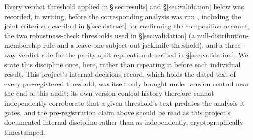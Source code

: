 \documentclass[preprint,12pt]{elsarticle}
\begin{document}
Every verdict threshold applied in \S\ref{sec:results} and \S\ref{sec:validation} below was recorded, in writing, before the corresponding analysis was run \cite{nosek2015,chambers2013}, including the joint criterion described in \S\ref{sec:dataset} for confirming the composition account, the two robustness-check thresholds used in \S\ref{sec:validation} (a null-distribution-membership rule and a leave-one-subject-out jackknife threshold), and a three-way verdict rule for the parity-split replication described in \S\ref{sec:validation}. We state this discipline once, here, rather than repeating it before each individual result. This project's internal decisions record, which holds the dated text of every pre-registered threshold, was itself only brought under version control near the end of this audit; its own version-control history therefore cannot independently corroborate that a given threshold's text predates the analysis it gates, and the pre-registration claim above should be read as this project's documented internal discipline rather than as independently, cryptographically timestamped.
\end{document}

